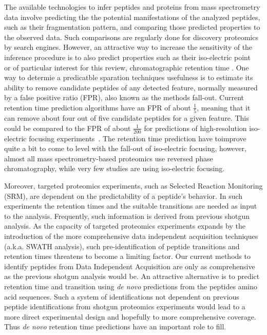 \documentclass[a4paper]{article}
\begin{document}
The available technologies to infer peptides and proteins from mass
spectrometry data involve predicting the the potential manifestations
of the analyzed peptides, such as their fragmentation pattern, and
comparing those predicted properties to the observed data. Such
comparisons are regularly done for discovery proteomics by search
engines. However, an attractive way to increase the sensitivity of the
inference procedure is to also predict properties such as their
iso-electric point~\cite{perez2011silico,branca2014hirief} or of
particular interest for this review, chromatographic retention time
\cite{cerqueira2010mude}. One way to determie a predicatble sparation
techniques usefulness is to estimate its ability to remove candidate
peptides of any detected feature, normally measured by a false
positive ratio (FPR), also known as the methods fall-out. Current
retention time prediction algorithms have an FPR of about
$\frac{1}{5}$, meaning that it can remove about four out of five
candidate peptides for a given feature. This could be compared to the
FPR of about $\frac{1}{200}$ for predictions of high-resolution
iso-electric focusing experiments~\cite{branca2014hirief}. The
retention time prediction have toimprove quite a bit to come to level
with the fall-out of iso-electric focusing, however, almost all mass
spectrometry-based proteomics use reversed phase chromatography, while
very few studies are using iso-electric focusing.


Moreover, targeted proteomics experiments, such as Selected Reaction
Monitoring (SRM), are dependent on the predictability of a peptide's
behavior. In such experiments the retention times and the suitable
transitions are needed as input to the analysis. Frequently, such
information is derived from previous shotgun analysis. As the capacity
of targeted proteomics experiments expands by the introduction of the
more comprehensive data independent acquisition techniques
\cite{Venable2004} (a.k.a. SWATH analysis), such pre-identification of
peptide transitions and retention times threatens to become a limiting
factor. Our current methods to identify peptides from Data Independent
Acquisition are only as comprehensive as the previous shotgun analysis
would be. An attractive alternative is to predict retention time and
transition using {\em de novo} predictions from the peptides amino
acid sequences.  Such a system of identifications not dependent on
previous peptide identifications from shotgun proteomics experiments
would lead to a more direct experimental design and hopefully to more
comprehensive coverage. Thus {\em de novo} retention time predictions
have an important role to fill.




\end{document}
